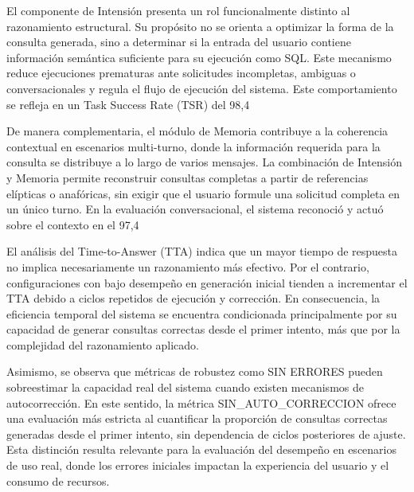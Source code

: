 \documentclass[journal]{IEEEtran}
\begin{document}
El componente de Intensión presenta un rol funcionalmente distinto al razonamiento estructural. Su propósito no se orienta a optimizar la forma de la consulta generada, sino a determinar si la entrada del usuario contiene información semántica suficiente para su ejecución como SQL. Este mecanismo reduce ejecuciones prematuras ante solicitudes incompletas, ambiguas o conversacionales y regula el flujo de ejecución del sistema. Este comportamiento se refleja en un Task Success Rate (TSR) del 98,4 %

De manera complementaria, el módulo de Memoria contribuye a la coherencia contextual en escenarios multi-turno, donde la información requerida para la consulta se distribuye a lo largo de varios mensajes. La combinación de Intensión y Memoria permite reconstruir consultas completas a partir de referencias elípticas o anafóricas, sin exigir que el usuario formule una solicitud completa en un único turno. En la evaluación conversacional, el sistema reconoció y actuó sobre el contexto en el 97,4 %

El análisis del Time-to-Answer (TTA) indica que un mayor tiempo de respuesta no implica necesariamente un razonamiento más efectivo. Por el contrario, configuraciones con bajo desempeño en generación inicial tienden a incrementar el TTA debido a ciclos repetidos de ejecución y corrección. En consecuencia, la eficiencia temporal del sistema se encuentra condicionada principalmente por su capacidad de generar consultas correctas desde el primer intento, más que por la complejidad del razonamiento aplicado.

Asimismo, se observa que métricas de robustez como SIN ERRORES pueden sobreestimar la capacidad real del sistema cuando existen mecanismos de autocorrección. En este sentido, la métrica SIN\_AUTO\_CORRECCION ofrece una evaluación más estricta al cuantificar la proporción de consultas correctas generadas desde el primer intento, sin dependencia de ciclos posteriores de ajuste. Esta distinción resulta relevante para la evaluación del desempeño en escenarios de uso real, donde los errores iniciales impactan la experiencia del usuario y el consumo de recursos.
\end{document}
